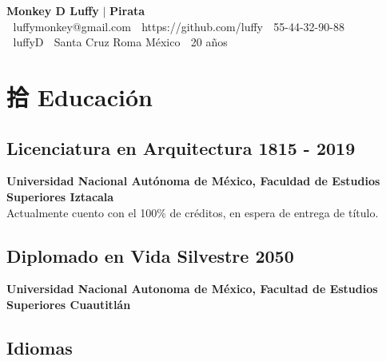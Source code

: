 \documentclass[11pt,a4paper]{article}
\begin{document}
\color{txt}

\begin{center}
    \Huge{ \textcolor{title}{\textbf{Monkey D Luffy} } \textcolor{line}{$|$} }  \Huge{\textbf{Pirata}}\\
    \vspace{10pt}
  \small{
  \textcolor{personalinfo}{
    {\ttfamily }\hspace{0.1cm} luffymonkey@gmail.com \hspace{0.25cm} 
    {\ttfamily }\hspace{0.1cm} https://github.com/luffy\hspace{0.25cm} 
    {\ttfamily }\hspace{0.1cm} 55-44-32-90-88} \hspace{0.25cm}\\
    }
    \textcolor{personalinfo}{
    {\ttfamily }\hspace{0.1cm} luffyD
    {\ttfamily }\hspace{0.1cm} Santa Cruz Roma  México\hspace{0.25cm} 
    {\ttfamily }\hspace{0.1cm} 20 años
    }
\end{center}

\textcolor{line}{ \hline}


\section*{{\ttfamily 拾 }Educación}


\subsection*{Licenciatura en Arquitectura \hfill {\small\textbf{1815 - 2019}} }

\textbf{Universidad Nacional Autónoma de México, Faculdad de Estudios Superiores Iztacala}\\[1pt]
Actualmente cuento con el 100$\%$ de créditos, en espera de entrega de título.



\subsection*{Diplomado en Vida Silvestre \hfill {\small\textbf{2050}} }
\textbf{Universidad Nacional Autonoma de México, Facultad de Estudios Superiores Cuautitlán} 

\subsection*{Idiomas}
\end{document}
